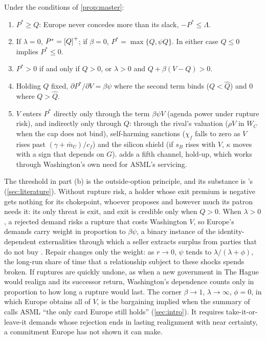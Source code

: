 \begin{corollary}\label{cor:master}
Under the conditions of \cref{prop:master}:
\begin{enumerate}[label=(\alph*)]
\item $P^*\ge Q$: Europe never concedes more than its slack, $-P^*\le\Lambda$.
\item If $\lambda=0$, $P^*=\left[Q\right]^{+}$; if $\beta=0$, $P^*=\max\{Q,\psi Q\}$. In either case $Q\le 0$ implies $P^*\le 0$.
\item $P^*>0$ if and only if $Q>0$, or $\lambda>0$ and $Q+\beta(V-Q)>0$.
\item Holding $Q$ fixed, $\partial P^*/\partial V=\beta\psi$ where the second term binds ($Q<\hat Q$) and $0$ where $Q>\hat Q$.
\item $V$ enters $P^*$ directly only through the term $\beta\psi V$ (agenda power under rupture risk), and indirectly only through $Q$: through the rival's valuation ($\rho V$ in $W_C$ when the cap does not bind), self-harming sanctions ($\chi_f$ falls to zero as $V$ rises past $(\gamma+\bar m_U)/c_f$) and the silicon shield (if $s_B$ rises with $V$, $\kappa$ moves with a sign that depends on $G$).  adds a fifth channel, hold-up, which works through Washington's own need for ASML's servicing.
\end{enumerate}
\end{corollary}

The threshold in part (b) is the outside-option principle, and its substance is \citeauthor{wagner1988economic}'s (\cref{sec:literature}). Without rupture risk, a holder whose exit premium is negative gets nothing for its chokepoint, whoever proposes and however much its patron needs it: its only threat is exit, and exit is credible only when $Q>0$. When $\lambda>0$, a rejected demand risks a rupture that costs Washington $V$, so Europe's demands carry weight in proportion to $\beta\psi$, a binary instance of the identity-dependent externalities through which a seller extracts surplus from parties that do not buy \citep{jehiel1996how}. Repair changes only the weight: as $r\to 0$, $\psi$ tends to $\lambda/(\lambda+\phi)$, the long-run share of time that a relationship subject to these shocks spends broken. If ruptures are quickly undone, as when a new government in The Hague would realign and its successor return, Washington's dependence counts only in proportion to how long a rupture would last. The corner $\beta\to 1$, $\lambda\to\infty$, $\phi=0$, in which Europe obtains all of $V$, is the bargaining implied when the summary of \citet{juijn2026europe} calls ASML ``the only card Europe still holds'' (\cref{sec:intro}). It requires take-it-or-leave-it demands whose rejection ends in lasting realignment with near certainty, a commitment Europe has not shown it can make.


